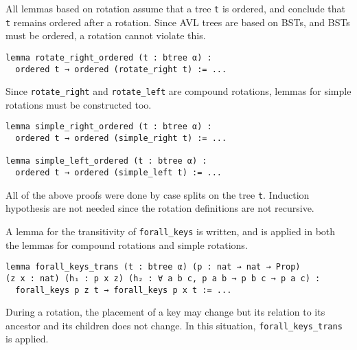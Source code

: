 All lemmas based on rotation assume that a tree \lstinline{t} is ordered, and conclude that \lstinline{t} remains ordered after a rotation. Since AVL trees are based on BSTs, and BSTs must be ordered, a rotation cannot violate this.

\begin{lstlisting}
lemma rotate_right_ordered (t : btree α) :
  ordered t → ordered (rotate_right t) := ...
\end{lstlisting}

Since \lstinline{rotate_right} and \lstinline{rotate_left} are compound rotations, lemmas for simple rotations must be constructed too. 

\begin{lstlisting}
lemma simple_right_ordered (t : btree α) :
  ordered t → ordered (simple_right t) := ...

lemma simple_left_ordered (t : btree α) :
  ordered t → ordered (simple_left t) := ...
\end{lstlisting}

All of the above proofs were done by case splits on the tree \lstinline{t}. Induction hypothesis are not needed since the rotation definitions are not recursive. 

A lemma for the transitivity of \lstinline{forall_keys} is written, and is applied in both the lemmas for compound rotations and simple rotations.

\begin{lstlisting}
lemma forall_keys_trans (t : btree α) (p : nat → nat → Prop) 
(z x : nat) (h₁ : p x z) (h₂ : ∀ a b c, p a b → p b c → p a c) :
  forall_keys p z t → forall_keys p x t := ...
\end{lstlisting}

During a rotation, the placement of a key may change but its relation to its ancestor and its children does not change. In this situation, \lstinline{forall_keys_trans} is applied. 